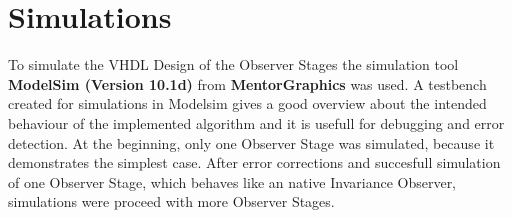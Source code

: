 %



\section{Simulations}
To simulate the VHDL Design of the Observer Stages  the simulation tool \textbf{ModelSim (Version 10.1d)} from \textbf{MentorGraphics} was used.  
A testbench created for simulations in Modelsim gives a good overview about the intended behaviour of the implemented algorithm and it is usefull for debugging and error detection.
At the beginning, only one Observer Stage was simulated, because it demonstrates the simplest case. After error corrections and succesfull simulation of one Observer Stage, which behaves 
like an native Invariance Observer, simulations were proceed with more Observer Stages.\\
 
